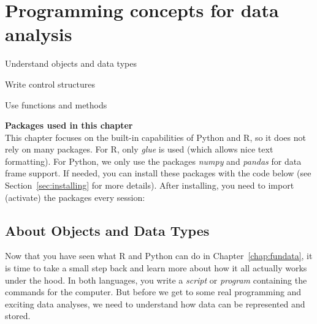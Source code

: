 \chapter{Programming concepts for data analysis}
\label{chap:programmingconcepts}

\begin{abstract}{Abstract}
  This chapter introduces readers to the basics of programming
  in Python and R. It
explains how to deal with objects, statements, expressions, variables
and different types of data, and shows how to create and understand
simple control structures such as loops and conditions.
\end{abstract}


\begin{objectives}
\item Understand objects and data types
\item Write control structures
\item Use functions and methods
\end{objectives}

\newpage
\begin{feature}
  \textbf{Packages used in this chapter}\\
  This chapter focuses on the built-in capabilities of Python and R,
  so it does not rely on many packages.
  For R, only \emph{glue} is used (which allows nice text formatting).
  For Python, we only use the packages \emph{numpy} and \emph{pandas}
  for data frame support.
  If needed, you can install these packages with the code below
  (see Section~\ref{sec:installing} for more details).
  \noindent After installing, you need to import (activate) the packages every session:
\end{feature}

%

\section{About Objects and Data Types}
\label{sec:datatypes}

Now that you have seen what R and Python can do in Chapter~\ref{chap:fundata},
it is time to take a small step back and learn more about how it all actually works under the hood.
In both languages, you write a
\emph{script} or \emph{program} containing the commands for the
computer.  But before we get to
some real programming and exciting data analyses, we need to understand
how data can be represented and stored.

